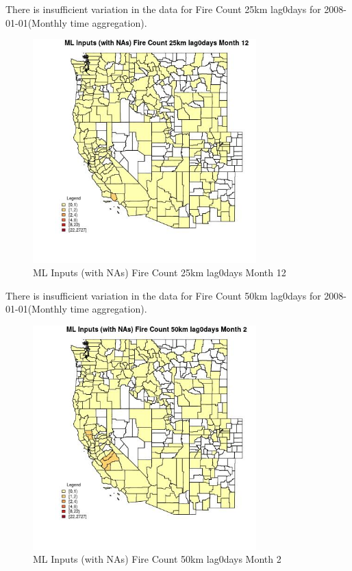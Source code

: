 There is insufficient variation in the data for Fire Count 25km lag0days for 2008-01-01(Monthly time aggregation). 
 

\begin{figure} 
\centering  
\includegraphics[width=0.77\textwidth]{Code_Outputs/Report_ML_input_PM25_Step4_part_f_de_duplicated_aves_prioritize_24hr_obswNAs_CountyFire_Count_25km_lag0daysmedianMonth12.jpg} 
\caption{\label{fig:Report_ML_input_PM25_Step4_part_f_de_duplicated_aves_prioritize_24hr_obswNAsCountyFire_Count_25km_lag0daysmedianMonth12}ML Inputs (with NAs) Fire Count 25km lag0days Month 12} 
\end{figure} 
 

There is insufficient variation in the data for Fire Count 50km lag0days for 2008-01-01(Monthly time aggregation). 
 

\begin{figure} 
\centering  
\includegraphics[width=0.77\textwidth]{Code_Outputs/Report_ML_input_PM25_Step4_part_f_de_duplicated_aves_prioritize_24hr_obswNAs_CountyFire_Count_50km_lag0daysmedianMonth2.jpg} 
\caption{\label{fig:Report_ML_input_PM25_Step4_part_f_de_duplicated_aves_prioritize_24hr_obswNAsCountyFire_Count_50km_lag0daysmedianMonth2}ML Inputs (with NAs) Fire Count 50km lag0days Month 2} 
\end{figure} 
 

